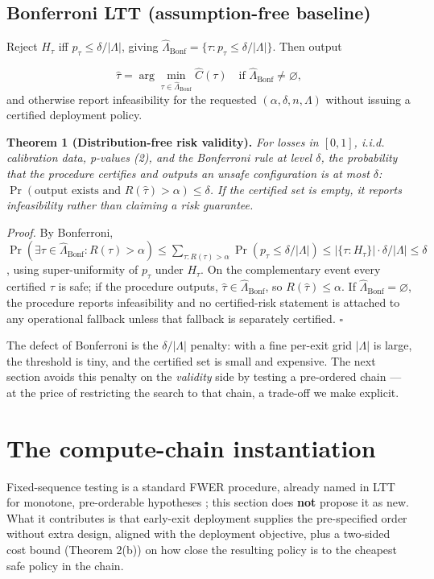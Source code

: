 \documentclass{ieeeaccess}
\begin{document}
\subsection{Bonferroni LTT (assumption-free baseline)}

Reject $H_\tau$ iff $p_\tau\le\delta/|\Lambda|$, giving $\hat\Lambda_{\mathrm{Bonf}}=\{\tau:p_\tau\le\delta/|\Lambda|\}$. Then output

\[
\hat\tau=\arg\min_{\tau\in\hat\Lambda_{\mathrm{Bonf}}}\hat C(\tau)
\quad\text{if }\hat\Lambda_{\mathrm{Bonf}}\ne\varnothing,
\]
and otherwise report infeasibility for the requested $(\alpha,\delta,n,\Lambda)$ without issuing a certified deployment policy.

\textbf{Theorem 1 (Distribution-free risk validity).} \emph{For losses in $[0,1]$, i.i.d. calibration data, p-values (2), and the Bonferroni rule at level $\delta$, the probability that the procedure certifies and outputs an unsafe configuration is at most $\delta$: $\Pr(\text{output exists and }R(\hat\tau)>\alpha)\le\delta$. If the certified set is empty, it reports infeasibility rather than claiming a risk guarantee.}

\emph{Proof.} By Bonferroni, $\Pr(\exists\tau\in\hat\Lambda_{\mathrm{Bonf}}:R(\tau)>\alpha)\le\sum_{\tau:R(\tau)>\alpha}\Pr(p_\tau\le\delta/|\Lambda|)\le |\{\tau:H_\tau\}|\cdot \delta/|\Lambda|\le\delta$, using super-uniformity of $p_\tau$ under $H_\tau$. On the complementary event every certified $\tau$ is safe; if the procedure outputs, $\hat\tau\in\hat\Lambda_{\mathrm{Bonf}}$, so $R(\hat\tau)\le\alpha$. If $\hat\Lambda_{\mathrm{Bonf}}=\varnothing$, the procedure reports infeasibility and no certified-risk statement is attached to any operational fallback unless that fallback is separately certified. $\square$

The defect of Bonferroni is the $\delta/|\Lambda|$ penalty: with a fine per-exit grid $|\Lambda|$ is large, the threshold is tiny, and the certified set is small and expensive. The next section avoids this penalty on the \emph{validity} side by testing a pre-ordered chain --- at the price of restricting the search to that chain, a trade-off we make explicit.

\section{The compute-chain instantiation}

Fixed-sequence testing is a standard FWER procedure, already named in LTT for monotone, pre-orderable hypotheses \cite{angelopoulos2025learn,wiens2003fixed}; this section does \textbf{not} propose it as new. What it contributes is that early-exit deployment supplies the pre-specified order without extra design, aligned with the deployment objective, plus a two-sided cost bound (Theorem 2(b)) on how close the resulting policy is to the cheapest safe policy in the chain.
\end{document}
